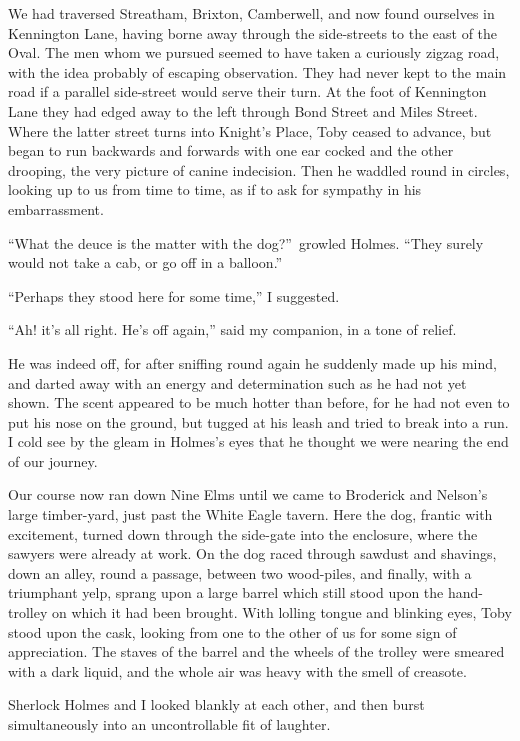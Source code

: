 \documentclass[12pt,english,oneside]{book}
\begin{document}
We had traversed Streatham, Brixton, Camberwell, and now found ourselves
in Kennington Lane, having borne away through the side-streets to
the east of the Oval. The men whom we pursued seemed to have taken
a curiously zigzag road, with the idea probably of escaping observation.
They had never kept to the main road if a parallel side-street would
serve their turn. At the foot of Kennington Lane they had edged away
to the left through Bond Street and Miles Street. Where the latter
street turns into Knight's Place, Toby ceased to advance, but began
to run backwards and forwards with one ear cocked and the other drooping,
the very picture of canine indecision. Then he waddled round in circles,
looking up to us from time to time, as if to ask for sympathy in his
embarrassment.

{}``What the deuce is the matter with the dog?''\ growled Holmes.
{}``They surely would not take a cab, or go off in a balloon.''

{}``Perhaps they stood here for some time,'' I suggested.

{}``Ah! it's all right. He's off again,'' said my companion, in
a tone of relief.

He was indeed off, for after sniffing round again he suddenly made
up his mind, and darted away with an energy and determination such
as he had not yet shown. The scent appeared to be much hotter than
before, for he had not even to put his nose on the ground, but tugged
at his leash and tried to break into a run. I cold see by the gleam
in Holmes's eyes that he thought we were nearing the end of our journey.

Our course now ran down Nine Elms until we came to Broderick and Nelson's
large timber-yard, just past the White Eagle tavern. Here the dog,
frantic with excitement, turned down through the side-gate into the
enclosure, where the sawyers were already at work. On the dog raced
through sawdust and shavings, down an alley, round a passage, between
two wood-piles, and finally, with a triumphant yelp, sprang upon a
large barrel which still stood upon the hand-trolley on which it had
been brought. With lolling tongue and blinking eyes, Toby stood upon
the cask, looking from one to the other of us for some sign of appreciation.
The staves of the barrel and the wheels of the trolley were smeared
with a dark liquid, and the whole air was heavy with the smell of
creasote.

Sherlock Holmes and I looked blankly at each other, and then burst
simultaneously into an uncontrollable fit of laughter.
\end{document}
